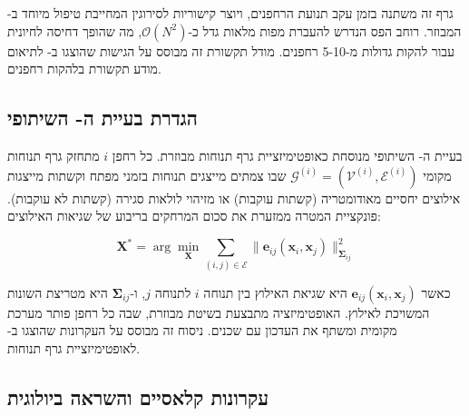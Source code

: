 גרף זה משתנה בזמן עקב תנועת הרחפנים, ויוצר קישוריות לסירוגין המחייבת טיפול מיוחד ב- המבוזר. רוחב הפס הנדרש להעברת מפות מלאות גדל כ-$\mathcal{O}(N^{2})$, מה שהופך דחיסה לחיונית עבור להקות גדולות מ-5-10 רחפנים. מודל תקשורת זה מבוסס על הגישות שהוצגו ב-\cite{Choudhary2017Comm} לתיאום מודע תקשורת בלהקות רחפנים.

\begin{table}[htbp]
\centering
\caption{מפרטי חיישנים ופרמטרי רעש בסימולציה.}
\label{tab:ch02_sensor_specs}
\end{table}

\subsection{הגדרת בעיית ה- השיתופי}
\label{sec:cslam_problem}

בעיית ה- השיתופי מנוסחת כאופטימיזציית גרף תנוחות מבוזרת. כל רחפן $i$ מתחזק גרף תנוחות מקומי $\mathcal{G}^{(i)} = (\mathcal{V}^{(i)}, \mathcal{E}^{(i)})$ שבו צמתים מייצגים תנוחות בזמני מפתח וקשתות מייצגות אילוצים יחסיים מאודומטריה (קשתות עוקבות) או מזיהוי לולאות סגירה (קשתות לא עוקבות). פונקציית המטרה ממזערת את סכום המרחקים בריבוע של שגיאות האילוצים:

\begin{equation}
\mathbf{X}^{*} = \arg\min_{\mathbf{X}} \sum_{(i,j) \in \mathcal{E}} \|\mathbf{e}_{ij}(\mathbf{x}_{i}, \mathbf{x}_{j})\|_{\mathbf{\Sigma}_{ij}}^{2}
\label{eq:pgo_objective}
\end{equation}

כאשר $\mathbf{e}_{ij}(\mathbf{x}_{i}, \mathbf{x}_{j})$ היא שגיאת האילוץ בין תנוחה $i$ לתנוחה $j$, ו-$\mathbf{\Sigma}_{ij}$ היא מטריצת השונות המשויכת לאילוץ. האופטימיזציה מתבצעת בשיטת  מבוזרת, שבה כל רחפן פותר מערכת מקומית ומשתף את העדכון עם שכנים. ניסוח זה מבוסס על העקרונות שהוצגו ב-\cite{Grisetti2010GraphSLAM} לאופטימיזציית גרף תנוחות.

\subsection{עקרונות  קלאסיים והשראה ביולוגית}
\label{sec:aco_principles}

